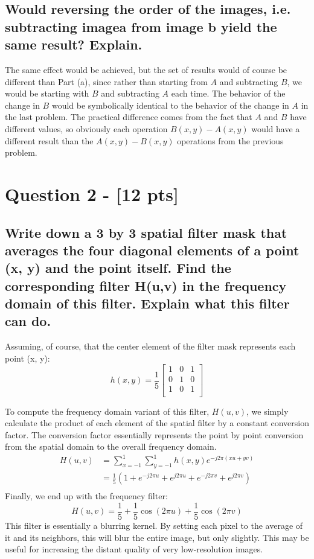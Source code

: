 \documentclass[11pt]{article}
\begin{document}
\subsection{Would reversing the order of the images, i.e. subtracting imagea from image b yield the same result? Explain.}
The same effect would be achieved, but the set of results would of course be different than Part (a), since rather than starting from $A$ and subtracting $B$, we would be starting with $B$ and subtracting $A$ each time. The behavior of the change in $B$ would be symbolically identical to the behavior of the change in $A$ in the last problem. The practical difference comes from the fact that $A$ and $B$ have different values, so obviously each operation $B(x,y) - A(x,y)$ would have a different result than the $A(x,y) - B(x,y)$ operations from the previous problem.



\section{Question 2 - [12 pts]}

\subsection{Write down a 3 by 3 spatial filter mask that averages the four diagonal elements of a point (x, y) and the point itself. Find the corresponding filter H(u,v) in the frequency domain of this filter. Explain what this filter can do.}
Assuming, of course, that the center element of the filter mask represents each point (x, y):
\[
h(x,y) = \frac{1}{5}
\begin{bmatrix}
1 & 0 & 1\\
0 & 1 & 0\\
1 & 0 & 1\\
\end{bmatrix}
\]

To compute the frequency domain variant of this filter, $H(u,v)$, we simply calculate the product of each element of the spatial filter by a constant conversion factor. The conversion factor essentially represents the point by point conversion from the spatial domain to the overall frequency domain.
\[
\begin{split}
H(u,v) & = \sum_{x=-1}^{1} \sum_{y=-1}^{1} h(x,y) e^{-j2 \pi (xu + yv)} \\
& = \frac{1}{5} (1 + e^{-j2 \pi u} + e^{j2 \pi u} + e^{-j2 \pi v} + e^{j2 \pi v} ) \\
\end{split}
\]
Finally, we end up with the frequency filter:
\[
H(u,v) = \frac{1}{5} + \frac{1}{5}\cos(2 \pi u) + \frac{1}{5}\cos(2 \pi v)
\]
This filter is essentially a blurring kernel. By setting each pixel to the average of it and its neighbors, this will blur the entire image, but only slightly. This may be useful for increasing the distant quality of very low-resolution images.
\end{document}
